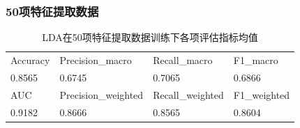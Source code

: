\documentclass[10pt]{article}
\begin{document}
\subsubsection*{50项特征提取数据}
\begin{table}[H]
  \centering
  \caption{LDA在50项特征提取数据训练下各项评估指标均值}
  \begin{tabular}{llll}
  \toprule
  Accuracy & Precision\_macro & Recall\_macro & F1\_macro \\
  0.8565 & 0.6745 & 0.7065 & 0.6866 \\
  \midrule
  AUC & Precision\_weighted & Recall\_weighted & F1\_weighted \\
  0.9182 & 0.8666 & 0.8565 & 0.8604 \\
  \bottomrule
  \end{tabular}
\end{table}
\end{document}

